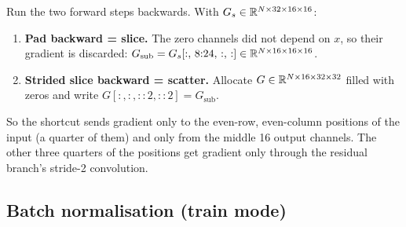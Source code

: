 \begin{repo}
Run the two forward steps backwards. With $G_s\in\mathbb{R}^{N\times32\times16\times16}$:
\begin{enumerate}[nosep]
  \item \textbf{Pad backward = slice.} The zero channels did not depend on $x$, so their gradient is discarded: $G_\text{sub} = G_s[:,\,8{:}24,\,:,\,:]\in\mathbb{R}^{N\times16\times16\times16}$.
  \item \textbf{Strided slice backward = scatter.} Allocate $G\in\mathbb{R}^{N\times16\times32\times32}$ filled with zeros and write $G[:,:,::2,::2] = G_\text{sub}$.
\end{enumerate}
So the shortcut sends gradient only to the even-row, even-column positions of the input (a quarter of them) and only from the middle 16 output channels. The other three quarters of the positions get gradient only through the residual branch's stride-2 convolution.
\end{repo}

\begin{center}
\end{center}

\subsection{Batch normalisation (train mode)}
\label{sec:bnback}

